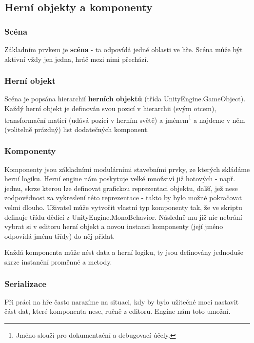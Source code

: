 \subsection{Herní objekty a komponenty}

\subsubsection*{Scéna}
Základním prvkem je \textbf{scéna} - ta odpovídá jedné oblasti ve hře. Scéna může být aktivní vždy jen jedna, hráč mezi nimi přechází.

\subsubsection*{Herní objekt}
Scéna je popsána hierarchií \textbf{herních objektů} (třída UnityEngine.GameObject). Každý herní objekt je definován svou pozicí v hierarchii (svým otcem), transformační maticí (udává pozici v herním světě) a jménem\footnote{Jméno slouží pro dokumentační a debugovací účely.} a najdeme v něm (volitelně prázdný) list dodatečných komponent.

\subsubsection*{Komponenty}
Komponenty jsou základními modulárními stavebními prvky, ze kterých skládáme herní logiku. Herní engine nám poskytuje velké množství již hotových - např. jednu, skrze kterou lze definovat grafickou reprezentaci objektu, další, jež nese zodpovědnost za vykreslení této reprezentace - takto by bylo možné pokračovat velmi dlouho. Uživatel může vytvořit vlastní typ komponenty tak, že ve skriptu definuje třídu dědící z UnityEngine.MonoBehavior. Následně mu již nic nebrání vybrat si v editoru herní objekt a novou instanci komponenty (její jméno odpovídá jménu třídy) do něj přidat.

Každá komponenta může nést data a herní logiku, ty jsou definovány jednoduše skrze instanční proměnné a metody.  

\subsubsection*{Serializace}

Při práci na hře často narazíme na situaci, kdy by bylo užitečné moci nastavit část dat, které komponenta nese, ručně z editoru. Engine nám toto umožní.

